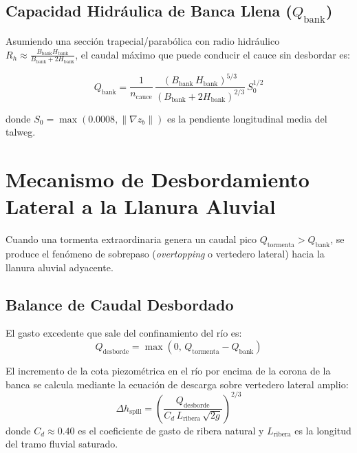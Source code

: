 \documentclass[11pt,a4paper]{article}
\begin{document}
\subsection{Capacidad Hidráulica de Banca Llena ($Q_{\text{bank}}$)}

Asumiendo una sección trapecial/parabólica con radio hidráulico $R_h \approx \frac{B_{\text{bank}} H_{\text{bank}}}{B_{\text{bank}} + 2 H_{\text{bank}}}$, el caudal máximo que puede conducir el cauce sin desbordar es:

\begin{equation}
  Q_{\text{bank}} = \frac{1}{n_{\text{cauce}}} \, \frac{\left(B_{\text{bank}} \, H_{\text{bank}}\right)^{5/3}}{\left(B_{\text{bank}} + 2 H_{\text{bank}}\right)^{2/3}} \, S_0^{1/2}
\end{equation}

donde $S_0 = \max(0.0008, \|\nabla z_b\|)$ es la pendiente longitudinal media del talweg.

\section{Mecanismo de Desbordamiento Lateral a la Llanura Aluvial}

Cuando una tormenta extraordinaria genera un caudal pico $Q_{\text{tormenta}} > Q_{\text{bank}}$, se produce el fenómeno de sobrepaso (\emph{overtopping} o vertedero lateral) hacia la llanura aluvial adyacente.

\subsection{Balance de Caudal Desbordado}

El gasto excedente que sale del confinamiento del río es:
\begin{equation}
  Q_{\text{desborde}} = \max\left(0, \, Q_{\text{tormenta}} - Q_{\text{bank}}\right)
\end{equation}

El incremento de la cota piezométrica en el río por encima de la corona de la banca se calcula mediante la ecuación de descarga sobre vertedero lateral amplio:
\begin{equation}
  \Delta h_{\text{spill}} = \left( \frac{Q_{\text{desborde}}}{C_d \, L_{\text{ribera}} \, \sqrt{2g}} \right)^{2/3}
\end{equation}
donde $C_d \approx 0.40$ es el coeficiente de gasto de ribera natural y $L_{\text{ribera}}$ es la longitud del tramo fluvial saturado.
\end{document}
